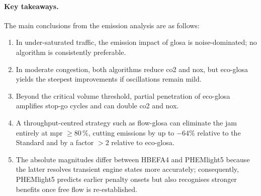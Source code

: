 \paragraph{Key takeaways.}
The main conclusions from the emission analysis are as follows:
\begin{enumerate}
  \item In under-saturated traffic, the emission impact of \ac{glosa} is noise-dominated; no algorithm is consistently preferable.
  \item In moderate congestion, both algorithms reduce \ac{co2} and \ac{nox}, but \ac{eco-glosa} yields the steepest improvements if oscillations remain mild.
  \item Beyond the critical volume threshold, partial penetration of \ac{eco-glosa} amplifies stop-go cycles and can double \ac{co2} and \ac{nox}.
  \item A throughput-centred strategy such as \ac{flow-glosa} can eliminate the jam entirely at \ac{mpr} $\geq80\,\%$, cutting emissions by up to $-64\%$ relative to the Standard and by a factor $>2$ relative to \ac{eco-glosa}.
  \item The absolute magnitudes differ between HBEFA4 and PHEMlight5 because the latter resolves transient engine states more accurately; consequently, PHEMlight5 predicts earlier penalty onsets but also recognises stronger benefits once free flow is re-established.
\end{enumerate}

